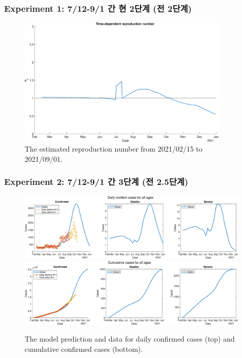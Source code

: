\documentclass[aspectratio=169, 9pt, xcolor=dvipsnames]{beamer}
\begin{document}
	\begin{frame}\frametitle{Experiment 1: 7/12-9/1 간 현 2단계 (전 2단계)}
	    \begin{figure}
	    	\centering
	    	\includegraphics[width=10cm]{../results/predict_exp_1_sd3_same_school_same/rep_num.eps}
	    	\caption{The estimated reproduction number from 2021/02/15 to 2021/09/01.}
	    \end{figure}
	\end{frame}

	\begin{frame}\frametitle{Experiment 2: 7/12-9/1 간 3단계 (전 2.5단계)}
	    \begin{figure}
	    	\centering
	    	\includegraphics[width=11cm]{../results/predict_exp_2_sd3_same_school_same/daily_all_age.eps}
	    	\includegraphics[width=11cm]{../results/predict_exp_2_sd3_same_school_same/cumul_all_age.eps}
	    	\caption{The model prediction and data for daily confirmed cases (top) and cumulative confirmed cases (bottom).}
	    \end{figure}
	\end{frame}
\end{document}
